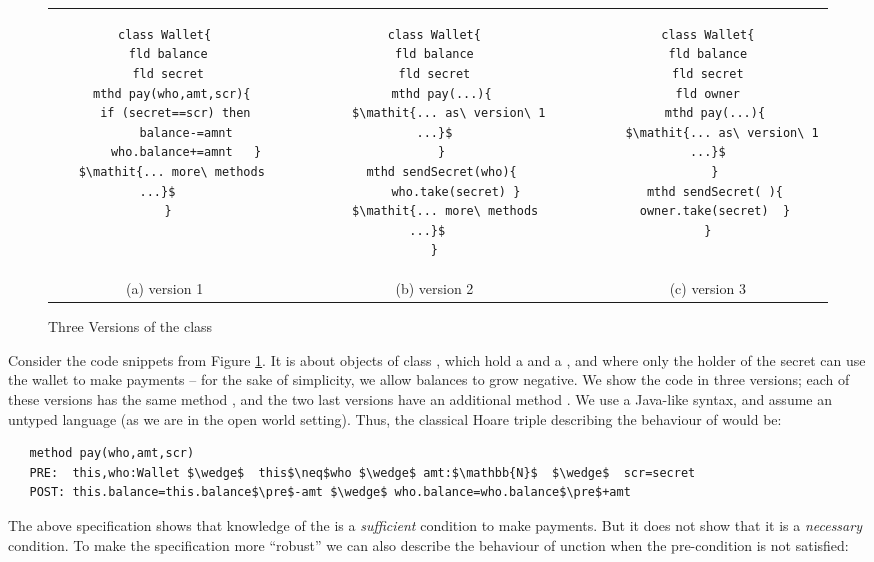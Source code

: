 \documentclass[acmsmall,screen]{acmart}
\begin{document}
 \begin{figure}[htb]
 \begin{tabular}{clclc}
\begin{minipage}{0.32\textwidth}
\begin{lstlisting}
class Wallet{
  fld balance 
  fld secret 
  mthd pay(who,amt,scr){
    if (secret==scr) then 
      balance-=amnt
      who.balance+=amnt   }
  $\mathit{... more\ methods ...}$  
 }
\end{lstlisting}
\end{minipage}
 & \ \ \ & 
\begin{minipage}{0.30\textwidth}
\begin{lstlisting}
class Wallet{
  fld balance  
  fld secret  
  mthd pay(...){
    $\mathit{... as\ version\ 1 ...}$
  }
  mthd sendSecret(who){
      who.take(secret) }
   $\mathit{... more\ methods ...}$  
}
\end{lstlisting}
\end{minipage} & \ \ \ &
\begin{minipage}{0.32\textwidth}
\begin{lstlisting}
class Wallet{
  fld balance  
  fld secret  
  fld owner  
  mthd pay(...){
    $\mathit{... as\ version\ 1 ...}$
  }
  mthd sendSecret( ){
    owner.take(secret)  }  
}
\end{lstlisting}
  \end{minipage}
\\
(a) version 1& & (b) version 2  & & (c)  version 3
 \end{tabular}
  \vspace*{-2.5mm}
  \caption{Three Versions of the class }
 \label{fig:Example}
 \end{figure}

Consider the code snippets from Figure \ref{fig:Example}. It is about objects of
 class , which hold a  and a , and where only the holder of the secret can use the wallet to
 make payments
 -- for the sake of simplicity, we allow   balances to grow negative.
 We show the code in three versions; each of these versions has the same method , and the two last versions
 have an additional method .
  We use a Java-like syntax, and assume an untyped language (as we are in the open world setting).
 Thus, the classical Hoare triple describing the behaviour of  would be:
 
\begin{lstlisting}
   method pay(who,amt,scr)
   PRE:  this,who:Wallet $\wedge$  this$\neq$who $\wedge$ amt:$\mathbb{N}$  $\wedge$  scr=secret   
   POST: this.balance=this.balance$\pre$-amt $\wedge$ who.balance=who.balance$\pre$+amt 
 \end{lstlisting}
\vspace{-.2in}
The above specification shows that knowledge of the  is a \emph{sufficient} condition to make payments. 
But it does not show that it is a \emph{necessary} condition. To make the specification  
  more ``robust'' we can also describe the behaviour of  unction  when the pre-condition is not satisfied:
\end{document}
